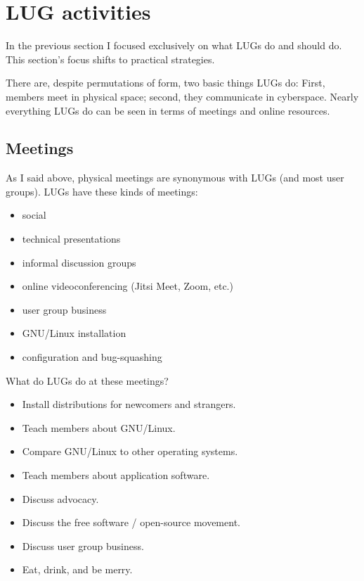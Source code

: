 

\section{LUG activities}

In the previous section I focused exclusively on what LUGs do and 
should do. This section's focus shifts to practical strategies.

There are, despite permutations of form, two basic things LUGs do:
First, members meet in physical space; second, they communicate
in cyberspace. Nearly everything LUGs do can be seen in terms of
meetings and online resources.




\subsection{Meetings}

As I said above, physical meetings are synonymous with LUGs (and 
most user groups).  LUGs have these kinds of meetings:

\begin{itemize}
\item social
\item technical presentations
\item informal discussion groups
\item online videoconferencing (Jitsi Meet, Zoom, etc.)
\item user group business
\item GNU/Linux installation
\item configuration and bug-squashing
\end{itemize}


What do LUGs do at these meetings?

\begin{itemize}
\item Install distributions for newcomers and strangers.
\item Teach members about GNU/Linux.
\item Compare GNU/Linux to other operating systems.
\item Teach members about application software.
\item Discuss advocacy.
\item Discuss the free software / open-source movement.
\item Discuss user group business.
\item Eat, drink, and be merry.
\end{itemize}








